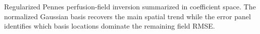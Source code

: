 \caption{Regularized Pennes perfusion-field inversion summarized in coefficient space. The normalized Gaussian basis recovers the main spatial trend while the error panel identifies which basis locations dominate the remaining field RMSE.}\label{fig:field-inversion-coefficients}
